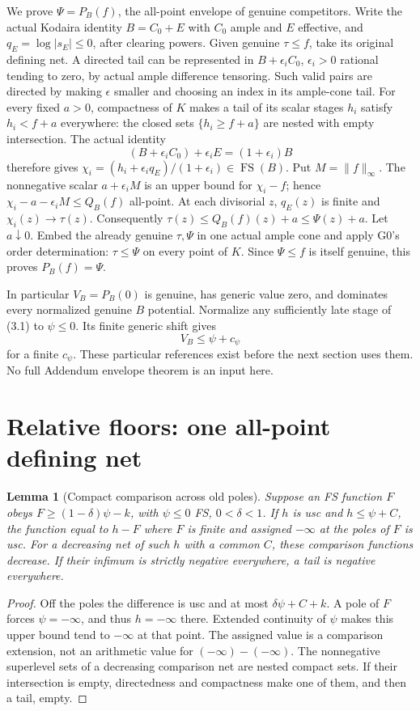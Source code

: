 \documentclass[10pt]{article}
\newtheorem{lemma}[theorem]{Lemma}
\newcommand{\FS}{\operatorname{FS}}
\begin{document}
We prove $\Psi=P_B(f)$, the all-point envelope of genuine competitors.
Write the actual Kodaira identity $B=C_0+E$ with $C_0$ ample and $E$ effective,
and $q_E=\log|s_E|\leq0$, after clearing powers. Given genuine $\tau\leq f$,
take its original defining net. A directed tail can be represented in
$B+\epsilon_i C_0$, $\epsilon_i>0$ rational tending to zero, by actual ample
difference tensoring. Such valid pairs are directed by making $\epsilon$
smaller and choosing an index in its ample-cone tail. For every fixed
$a>0$, compactness of $K$ makes a tail of its scalar stages $h_i$ satisfy
$h_i<f+a$ everywhere: the closed sets $\{h_i\geq f+a\}$ are nested with
empty intersection. The actual identity
\[
 (B+\epsilon_i C_0)+\epsilon_i E=(1+\epsilon_i)B
\]
therefore gives $\chi_i=(h_i+\epsilon_i q_E)/(1+\epsilon_i)\in\FS(B)$.
Put $M=\|f\|_\infty$. The nonnegative scalar
$a+\epsilon_i M$ is an upper bound for $\chi_i-f$; hence
$\chi_i-a-\epsilon_i M\leq Q_B(f)$ all-point. At each divisorial $z$,
$q_E(z)$ is finite and $\chi_i(z)\to\tau(z)$. Consequently
$\tau(z)\leq Q_B(f)(z)+a\leq\Psi(z)+a$. Let $a\downarrow0$.
Embed the already genuine $\tau,\Psi$ in one actual ample cone and apply
G0's order determination: $\tau\leq\Psi$ on every point of $K$.
Since $\Psi\leq f$ is itself genuine, this proves $P_B(f)=\Psi$.

In particular $V_B=P_B(0)$ is genuine, has generic value zero, and dominates
every normalized genuine $B$ potential. Normalize any sufficiently late
stage of (3.1) to $\psi\leq0$. Its finite generic shift gives
\[
 V_B\leq\psi+c_\psi                                \tag{3.3}
\]
for a finite $c_\psi$. These particular references exist before the next
section uses them. No full Addendum envelope theorem is an input here.

\section{Relative floors: one all-point defining net}
\begin{lemma}[Compact comparison across old poles]\label{polelemma}
Suppose an FS function $F$ obeys
$F\geq(1-\delta)\psi-k$, with $\psi\leq0$ FS, $0<\delta<1$.
If $h$ is usc and $h\leq\psi+C$, the function equal to $h-F$ where $F$
is finite and assigned $-\infty$ at the poles of $F$ is usc. For a decreasing
net of such $h$ with a common $C$, these comparison functions decrease.
If their infimum is strictly negative everywhere, a tail is negative everywhere.
\end{lemma}
\begin{proof}
Off the poles the difference is usc and at most $\delta\psi+C+k$.
A pole of $F$ forces $\psi=-\infty$, and thus $h=-\infty$ there. Extended
continuity of $\psi$ makes this upper bound tend to $-\infty$ at that point.
The assigned value is a comparison extension, not an arithmetic value for
$(-\infty)-(-\infty)$. The nonnegative superlevel sets of a decreasing
comparison net are nested compact sets. If their intersection is empty,
directedness and compactness make one of them, and then a tail, empty.
\end{proof}
\end{document}
